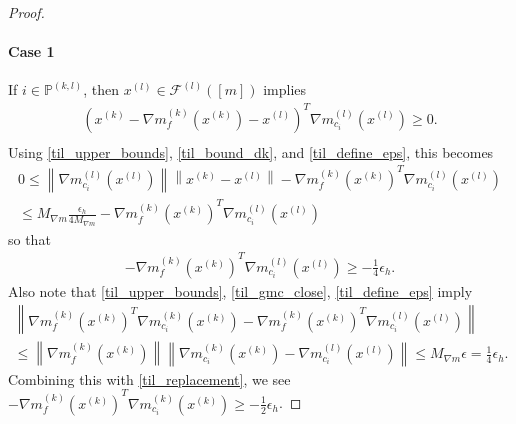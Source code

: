 \documentclass{article}
\newenvironment{comment}
  {\par\medskip
   \color{red}%
   \begin{framed}
   \textbf{Comment: }\ignorespaces}
 {\end{framed}
  \medskip}
\theoremstyle{case}
\numberwithin{theorem}{subsection}
\newcommand{\feasiblel}{{\mathcal F^{(l)}}}
\newcommand{\gk}{{\nabla m_f^{(k)}\left(\xk\right)}}
\newcommand{\gmcik}{{\nabla m_{c_i}^{(k)}\left(\xk\right)}}
\newcommand{\gmcil}{{\nabla m_{c_i}^{(l)}\left(\xl\right)}}
\newcommand{\mcil}{{{m}^{(l)}_{c_i}}}
\newcommand{\xk}{x^{(k)}}
\newcommand{\xl}{{x^{(l)}}}
\newcommand{\projkl}{{p^{(k,l)}}}
\newcommand{\activeprojkl}{{\mathbb P^{(k, l)}}}
\newcommand{\maxmodelgrad}{{M_{\nabla m}}}
\newcommand{\huffeps}{{\epsilon_h}}
\begin{document}
\begin{proof}
\paragraph{Case 1}
% 
% 
% 



If $i \in \activeprojkl$, then $\xl \in \feasiblel\left([m]\right)$ implies
\begin{align*}
\left(\xk - \gk - \xl\right)^T \gmcil \ge 0. \\
\end{align*}
Using \cref{til_upper_bounds}, \cref{til_bound_dk}, and \cref{til_define_eps}, this becomes
\begin{align*}
0 \le \left\| \gmcil \right\| \left\|\xk - \xl \right\|- \gk^T \gmcil \\
\le \maxmodelgrad \frac {\huffeps} {4\maxmodelgrad} - \gk^T \gmcil
\end{align*}
so that
\begin{align}
\label{til_replacement}
- \gk^T \gmcil \ge -\frac 1 4 \huffeps .
\end{align}
Also note that \cref{til_upper_bounds}, \cref{til_gmc_close}, \cref{til_define_eps} imply
\begin{align*}
\left\|
 \gk^T \gmcik
-\gk^T \gmcil
\right\| \\
\le \left\|\gk\right\| \left\|\gmcik - \gmcil\right\|
\le \maxmodelgrad \epsilon = \frac 1 {4} \huffeps.
\end{align*}
Combining this with \cref{til_replacement}, we see $-\gk^T \gmcik \ge - \frac 1 2 \huffeps$.

\end{proof}
\end{document}
